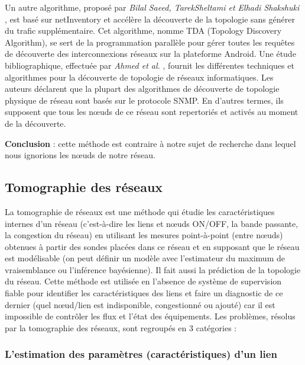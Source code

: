 \newline
Un autre algorithme, propos\'e par {\em Bilal Saeed, TarekSheltami et Elhadi Shakshuki} \cite{SAEED2015104}, est bas\'e sur netInventory et acc\'el\`ere la d\'ecouverte de la topologie sans g\'en\'erer du trafic suppl\'ementaire. Cet algorithme, nomme TDA (Topology Discovery Algorithm), se sert de la programmation parall\`ele pour g\'erer toutes les requ\^etes de d\'ecouverte des interconnexions r\'eseaux sur la plateforme Android.
Une \'etude bibliographique, effectu\'ee par {\em Ahmed et al.} \cite{AhmedRafatAbouchabaka2014}, fournit les diff\'erentes techniques et algorithmes pour la d\'ecouverte de topologie de r\'eseaux informatiques. Les auteurs d\'eclarent que la plupart des algorithmes de d\'ecouverte de topologie physique de r\'eseau sont bas\'es sur le protocole SNMP. En d'autres termes, ils supposent que tous les n\oe uds de ce r\'eseau sont repertori\'es et activ\'es au moment de la d\'ecouverte. 
\newline

{\bf Conclusion} :
cette m\'ethode est contraire \`a notre sujet de recherche dans lequel nous ignorions les n\oe uds de notre r\'eseau.

\subsection{Tomographie des r\'eseaux}
La tomographie de r\'eseaux est une m\'ethode qui \'etudie les caract\'eristiques internes d'un r\'eseau (c'est-\`a-dire les liens et n\oe uds ON/OFF, la bande passante, la congestion du r\'eseau) en utilisant les mesures point-\`a-point (entre n\oe uds) obtenues \`a partir des sondes plac\'ees dans ce r\'eseau et en supposant que le r\'eseau est mod\'elisable (on peut d\'efinir un mod\`ele avec l'estimateur du maximum de vraisemblance ou l'inf\'erence bay\'esienne). Il fait aussi la pr\'ediction de la topologie du r\'eseau.
\newline
Cette m\'ethode est utilis\'ee en l'absence de syst\`eme de supervision fiable pour identifier les caract\'eristiques des liens et faire un diagnostic de ce dernier (quel n\oe ud/lien est indisponible, congestionn\'e ou ajout\'e) car il est impossible de contr\^oler les flux et l'\'etat des \'equipements.
Les probl\`emes, r\'esolus par la tomographie des r\'eseaux,  sont regroup\'es en $3$ cat\'egories :

\subsubsection{L'estimation des param\`etres (caract\'eristiques) d'un lien}

